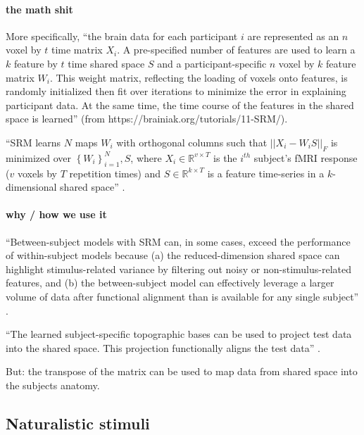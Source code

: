 \paragraph{the math shit}
%
More specifically, ``the brain data for each participant $i$ are represented as
an \textbf{$n$} voxel by $t$ time matrix  $X_{i}$. A pre-specified number of
features are used to learn a $k$ feature by  $t$ time shared space $S$ and a
participant-specific $n$ voxel by $k$  feature matrix $W_{i}$. This weight
matrix, reflecting the loading of voxels onto features, is randomly initialized
then fit over iterations to minimize the error in explaining participant data.
At the same time, the time course of the features in the shared space is
learned'' (from https://brainiak.org/tutorials/11-SRM/).

%
``SRM learns $N$ maps $W_{i}$ with orthogonal columns such that
$||X_{i}-W_{i}S||_{F}$ is minimized over $\left\{ W_{i}\right\} _{i=1}^{N},S$,
where $X_{i}\in\mathbb{R}^{v\times{T}}$ is the $i^{th}$ subject's fMRI response
($v$ voxels by $T$ repetition times) and $S\in\mathbb{R}^{k\times{T}}$ is a
feature time-series in a $k$-dimensional shared space''
\citep{vodrahalli2018mapping}.


\paragraph{why / how we use it}



%
``Between-subject models with SRM can, in some cases, exceed the performance of
within-subject models because (a) the reduced-dimension shared space can
highlight stimulus-related variance by filtering out noisy or
non-stimulus-related features, and (b) the between-subject model can effectively
leverage a larger volume of data after functional alignment than is available
for any single subject'' \citep{kumar2020brainiak}.

%
``The learned subject-specific topographic bases can be used to project test
data into the shared space. This projection functionally aligns the test data''
\citep{kumar2020brainiak}.

But: the transpose of the matrix can be used to map data from shared space into
the subjects anatomy.


\subsection{Naturalistic stimuli}


